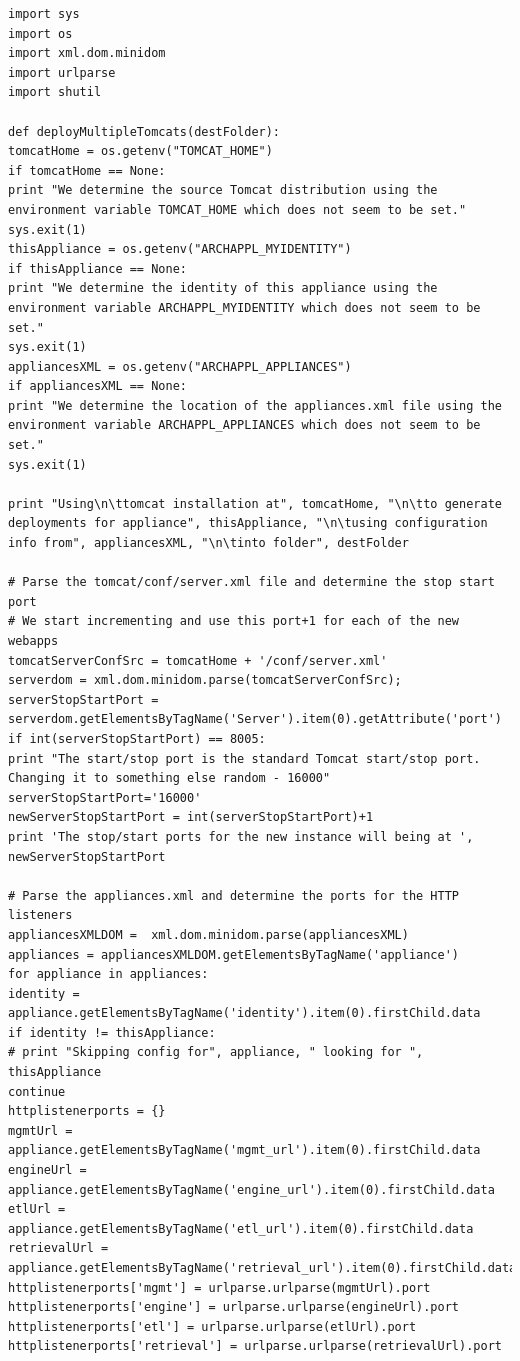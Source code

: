 \documentclass[11pt
  , a4paper
  , article
  , oneside
]{memoir}
\begin{document}
\begin{lstlisting}[style=termstyle]
import sys
import os
import xml.dom.minidom
import urlparse
import shutil

def deployMultipleTomcats(destFolder):
tomcatHome = os.getenv("TOMCAT_HOME")
if tomcatHome == None:
print "We determine the source Tomcat distribution using the environment variable TOMCAT_HOME which does not seem to be set."
sys.exit(1)
thisAppliance = os.getenv("ARCHAPPL_MYIDENTITY")
if thisAppliance == None:
print "We determine the identity of this appliance using the environment variable ARCHAPPL_MYIDENTITY which does not seem to be set."
sys.exit(1)
appliancesXML = os.getenv("ARCHAPPL_APPLIANCES")
if appliancesXML == None:
print "We determine the location of the appliances.xml file using the environment variable ARCHAPPL_APPLIANCES which does not seem to be set."
sys.exit(1)

print "Using\n\ttomcat installation at", tomcatHome, "\n\tto generate deployments for appliance", thisAppliance, "\n\tusing configuration info from", appliancesXML, "\n\tinto folder", destFolder

# Parse the tomcat/conf/server.xml file and determine the stop start port
# We start incrementing and use this port+1 for each of the new webapps
tomcatServerConfSrc = tomcatHome + '/conf/server.xml'
serverdom = xml.dom.minidom.parse(tomcatServerConfSrc);
serverStopStartPort = serverdom.getElementsByTagName('Server').item(0).getAttribute('port')
if int(serverStopStartPort) == 8005:
print "The start/stop port is the standard Tomcat start/stop port. Changing it to something else random - 16000"
serverStopStartPort='16000'
newServerStopStartPort = int(serverStopStartPort)+1
print 'The stop/start ports for the new instance will being at ', newServerStopStartPort

# Parse the appliances.xml and determine the ports for the HTTP listeners
appliancesXMLDOM =  xml.dom.minidom.parse(appliancesXML)
appliances = appliancesXMLDOM.getElementsByTagName('appliance')
for appliance in appliances:
identity = appliance.getElementsByTagName('identity').item(0).firstChild.data
if identity != thisAppliance:
# print "Skipping config for", appliance, " looking for ", thisAppliance
continue
httplistenerports = {}
mgmtUrl = appliance.getElementsByTagName('mgmt_url').item(0).firstChild.data
engineUrl = appliance.getElementsByTagName('engine_url').item(0).firstChild.data
etlUrl = appliance.getElementsByTagName('etl_url').item(0).firstChild.data
retrievalUrl = appliance.getElementsByTagName('retrieval_url').item(0).firstChild.data
httplistenerports['mgmt'] = urlparse.urlparse(mgmtUrl).port
httplistenerports['engine'] = urlparse.urlparse(engineUrl).port
httplistenerports['etl'] = urlparse.urlparse(etlUrl).port
httplistenerports['retrieval'] = urlparse.urlparse(retrievalUrl).port


\end{lstlisting}
\end{document}
